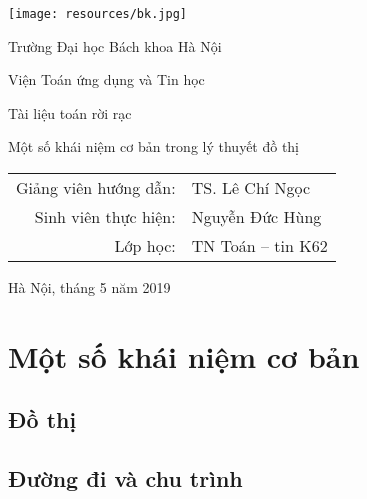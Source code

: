 

\usepackage[backend=bibtex]{biblatex}
\usepackage[utf8]{vietnam}
\usepackage[T1]{fontenc}
\usepackage{inconsolata}

\renewcommand{\bibname}{Danh mục tài liệu tham khảo}
\nocite{*}

\newcommand{\abs}[1]{\left\lvert#1\right\rvert}
\everymath{\displaystyle}
\renewcommand{\qedsymbol}{$\blacksquare$}


\pagestyle{plain}
\pagestyle{fancy}
\lhead{\thepage}
\cfoot{}
\renewcommand{\footrulewidth}{0pt}
\begin{titlepage}
	\begin{minipage}[c]{4em}
		\texttt{[image: resources/bk.jpg]}
	\end{minipage}
	\begin{minipage}[l]{\textwidth - 4em}
		{\Huge Trường Đại học Bách khoa Hà Nội\par}
		{\large Viện Toán ứng dụng và Tin học}
	\end{minipage}
	\vfill
	\vfill
	\begin{center}
		{\Large Tài liệu toán rời rạc}\par
		{\LARGE Một số khái niệm cơ bản trong lý thuyết đồ thị}\par
		\vfill
		{\large
			\begin{tabular}{rl}
				{ Giảng viên hướng dẫn}:&TS. Lê Chí Ngọc\\
				{ Sinh viên thực hiện:}& Nguyễn Đức Hùng\\
				{ Lớp học:} & TN Toán -- tin K62
			\end{tabular}
		}
		\vfill
		{\large Hà Nội, tháng 5 năm 2019}
	\end{center}
\end{titlepage}
\tableofcontents

\chapter{Một số khái niệm cơ bản}
\section{Đồ thị}


\section{Đường đi và chu trình}


